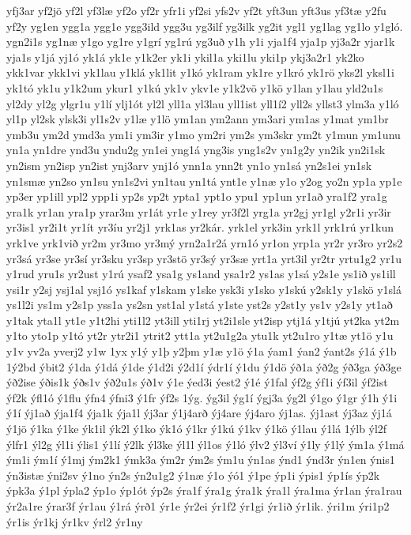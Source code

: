 {yfj3ar
yf2jö
yf2l
yf3læ
yf2o
yf2r
yfr1i
yf2si
yfs2v
yf2t
yft3un
yft3us
yf3tæ
y2fu
yf2y
yg1en
ygg1a
ygg1e
ygg3ild
ygg3u
yg3ilf
yg3ilk
yg2it
ygl1
yg1lag
yg1lo
y1gló.
ygn2i1s
yg1næ
y1go
yg1re
y1grí
yg1rú
yg3uð
y1h
y1i
yja1f4
yja1p
yj3a2r
yjar1k
yja1s
y1já
yj1ó
yk1á
yk1e
y1k2er
yk1i
ykil1a
yki1lu
yki1p
ykj3a2r1
yk2ko
ykk1var
ykk1vi
yk1lau
y1klá
yk1lit
y1kó
yk1ram
yk1re
y1kró
yk1rö
yks2l
yksl1i
yk1tó
yk1u
y1k2um
ykur1
y1kú
yk1v
ykv1e
y1k2vö
y1kö
y1lan
y1lau
yld2u1s
yl2dy
yl2g
ylgr1u
y1lí
ylj1ót
yl2l
yll1a
yl3lau
yll1ist
yll1í2
yll2s
yllst3
ylm3a
y1ló
yl1p
yl2sk
ylsk3i
yl1s2v
y1læ
y1lö
ym1an
ym2ann
ym3ari
ym1as
y1mat
ym1br
ymb3u
ym2d
ymd3a
ym1i
ym3ir
y1mo
ym2ri
ym2s
ym3skr
ym2t
y1mun
ym1unu
yn1a
yn1dre
ynd3u
yndu2g
yn1ei
yng1á
yng3is
yng1s2v
yn1g2y
yn2ik
yn2i1sk
yn2ism
yn2isp
yn2ist
ynj3arv
ynj1ó
ynn1a
ynn2t
yn1o
yn1sá
yn2s1ei
yn1sk
yn1smæ
yn2so
yn1su
yn1s2vi
yn1tau
yn1tá
ynt1e
y1næ
y1o
y2og
yo2n
yp1a
yp1e
yp3er
yp1ill
ypl2
ypp1i
yp2s
yp2t
ypta1
ypt1o
ypu1
yp1un
yr1að
yra1f2
yra1g
yra1k
yr1an
yra1p
yrar3m
yr1át
yr1e
y1rey
yr3f2l
yrg1a
yr2gj
yr1gl
y2r1i
yr3ir
yr3is1
yr2i1t
yr1ít
yr3íu
yr2j1
yrk1as
yr2kár.
yrk1el
yrk3in
yrk1l
yrk1rú
yr1kun
yrk1ve
yrk1við
yr2m
yr3mo
yr3mý
yrn2a1r2á
yrn1ó
yr1on
yrp1a
yr2r
yr3ro
yr2s2
yr3sá
yr3se
yr3sí
yr3sku
yr3sp
yr3stö
yr3sý
yr3sæ
yrt1a
yrt3il
yr2tr
yrtu1g2
yr1u
y1rud
yru1s
yr2ust
y1rú
ysaf2
ysa1g
ys1and
ysa1r2
ys1as
y1sá
y2s1e
ys1ið
ys1ill
ysi1r
y2sj
ysj1al
ysj1ó
ys1kaf
y1skam
y1ske
ysk3i
y1sko
y1skú
y2sk1y
y1skö
y1slá
ys1l2i
ys1m
y2s1p
yss1a
ys2sn
yst1al
y1stá
y1ste
yst2s
y2st1y
ys1v
y2s1y
yt1að
y1tak
yta1l
yt1e
y1t2hi
yti1l2
yt3ill
yti1rj
yt2i1sle
yt2isp
ytj1á
y1tjú
yt2ka
yt2m
y1to
yto1p
y1tó
yt2r
ytr2i1
ytrit2
ytt1a
yt2u1g2a
ytu1k
yt2u1ro
y1tæ
yt1ö
y1u
y1v
yv2a
yverj2
y1w
1yx
y1ý
y1þ
y2þm
y1æ
y1ö
ý1a
ýam1
ýan2
ýant2s
ý1á
ý1b
1ý2bd
ýbit2
ý1da
ý1dá
ý1de
ý1d2i
ý2d1í
ýdr1í
ý1du
ý1dö
ýð1a
ýð2g
ýð3ga
ýð3ge
ýð2ise
ýðis1k
ýðs1v
ýð2u1s
ýð1v
ý1e
ýed3i
ýest2
ý1é
ý1fal
ýf2g
ýf1i
ýf3il
ýf2ist
ýf2k
ýfl1ó
ý1flu
ýfn4
ýfni3
ý1fr
ýf2s
1ýg.
ýg3il
ýg1í
ýgj3a
ýg2l
ý1go
ý1gr
ý1h
ý1i
ý1í
ýj1að
ýja1f4
ýja1k
ýja1l
ýj3ar
ý1j4arð
ýj4are
ýj4aro
ýj1as.
ýj1ast
ýj3az
ýj1á
ý1jö
ý1ka
ý1ke
ýk1il
ýk2l
ý1ko
ýk1ó
ý1kr
ý1kú
ý1kv
ý1kö
ý1lau
ý1lá
1ýlb
ýl2f
ýlfr1
ýl2g
ýl1i
ýlis1
ý1lí
ý2lk
ýl3ke
ýl1l
ýl1os
ý1ló
ýlv2
ýl3ví
ý1ly
ý1lý
ým1a
ý1má
ým1i
ým1í
ý1mj
ým2k1
ýmk3a
ým2r
ým2s
ým1u
ýn1as
ýnd1
ýnd3r
ýn1en
ýnis1
ýn3istæ
ýni2sv
ý1no
ýn2s
ýn2u1g2
ý1næ
ý1o
ýó1
ý1pe
ýp1i
ýpis1
ýp1ís
ýp2k
ýpk3a
ý1pl
ýpla2
ýp1o
ýp1ót
ýp2s
ýra1f
ýra1g
ýra1k
ýra1l
ýra1ma
ýr1an
ýra1rau
ýr2a1re
ýrar3f
ýr1au
ý1rá
ýrð1
ýr1e
ýr2ei
ýr1f2
ýr1gi
ýr1ið
ýr1ik.
ýri1m
ýri1p2
ýr1is
ýr1kj
ýr1kv
ýrl2
ýr1ny
}
